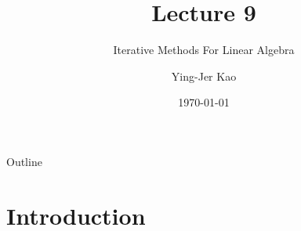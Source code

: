 \documentclass{beamer}
\title[Iterative Methods For Linear Algebra ] %
{Lecture 9}
\subtitle
{Iterative Methods For Linear Algebra } %
\author[Ying-Jer Kao] %
{Ying-Jer Kao}
\institute[National Taiwan University] %
{
  Department of Physics\\
 National Taiwan University
  }
\date[Numerical Analysis and Programming] %
{\today}
\begin{document}
\begin{frame}
  \titlepage
\end{frame}

\begin{frame}{Outline}
  \tableofcontents
\end{frame}



\section[Introduction]{Introduction}
\end{document}
